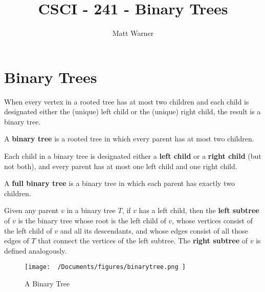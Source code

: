 \documentclass{report}
\title{\Huge{CSCI - 241 - Binary Trees}}
\author{\huge{Matt Warner}}
\date{\huge{}}
\begin{document}
  \maketitle
  \tableofcontents
  \newpage
  \chapter*{Binary Trees}
	When every vertex in a rooted tree has at most two children and each child is designated either the (unique) left child or the (unique) right child, the result is a binary tree.
	\vspace{5mm}

\noindent	A \textbf{binary tree} is a rooted tree in which every parent has at most two children. 
	\vspace{3mm}

	\noindent Each child in a binary tree is designated either a \textbf{left child} or a \textbf{right child} (but not both), and every parent has at most one left child and one right child. 
	\vspace{3mm}

	\noindent A \textbf{full binary tree} is a binary tree in which each parent has exactly two children.
	\vspace{3mm}

\noindent	Given any parent $v$ in a binary tree $T$, if $v$ has a left child, then the \textbf{left subtree} of $v$ is the binary tree whose root is the left child of $v$, whose vertices consist of the left child of $v$ and all its descendants, and whose edges consist of all those edges of $T$ that connect the vertices of the left subtree. The \textbf{right subtree} of $v$ is defined analogously.
\vspace{3mm}

\begin{figure}[ht]
\centering
\texttt{[image:  ~/Documents/figures/binarytree.png ]}
\caption{A Binary Tree}
\end{figure}
\bigbreak \noindent
\end{document}
